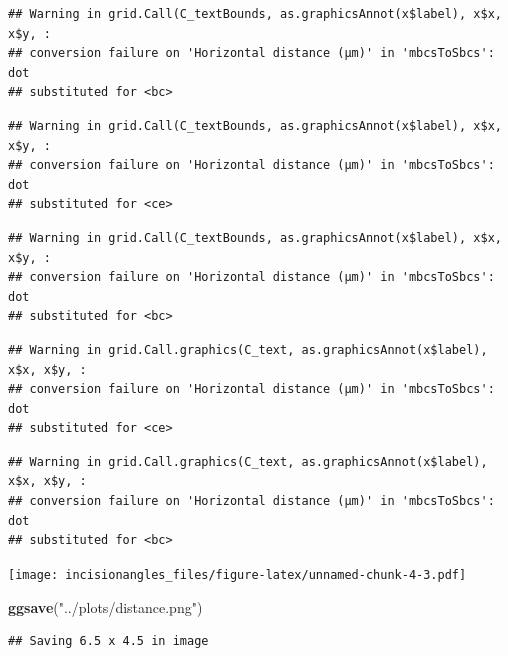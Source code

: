 \documentclass[
]{article}
\newenvironment{Shaded}{\begin{snugshade}}{\end{snugshade}}
\newcommand{\FunctionTok}[1]{\textcolor[rgb]{0.13,0.29,0.53}{\textbf{#1}}}
\newcommand{\NormalTok}[1]{#1}
\newcommand{\StringTok}[1]{\textcolor[rgb]{0.31,0.60,0.02}{#1}}
\begin{document}
\begin{verbatim}
## Warning in grid.Call(C_textBounds, as.graphicsAnnot(x$label), x$x, x$y, :
## conversion failure on 'Horizontal distance (μm)' in 'mbcsToSbcs': dot
## substituted for <bc>
\end{verbatim}

\begin{verbatim}
## Warning in grid.Call(C_textBounds, as.graphicsAnnot(x$label), x$x, x$y, :
## conversion failure on 'Horizontal distance (μm)' in 'mbcsToSbcs': dot
## substituted for <ce>
\end{verbatim}

\begin{verbatim}
## Warning in grid.Call(C_textBounds, as.graphicsAnnot(x$label), x$x, x$y, :
## conversion failure on 'Horizontal distance (μm)' in 'mbcsToSbcs': dot
## substituted for <bc>
\end{verbatim}

\begin{verbatim}
## Warning in grid.Call.graphics(C_text, as.graphicsAnnot(x$label), x$x, x$y, :
## conversion failure on 'Horizontal distance (μm)' in 'mbcsToSbcs': dot
## substituted for <ce>
\end{verbatim}

\begin{verbatim}
## Warning in grid.Call.graphics(C_text, as.graphicsAnnot(x$label), x$x, x$y, :
## conversion failure on 'Horizontal distance (μm)' in 'mbcsToSbcs': dot
## substituted for <bc>
\end{verbatim}

\texttt{[image: incisionangles\_files/figure-latex/unnamed-chunk-4-3.pdf]}

\begin{Shaded}
\begin{Highlighting}[]
\FunctionTok{ggsave}\NormalTok{(}\StringTok{"../plots/distance.png"}\NormalTok{)}
\end{Highlighting}
\end{Shaded}

\begin{verbatim}
## Saving 6.5 x 4.5 in image
\end{verbatim}
\end{document}
